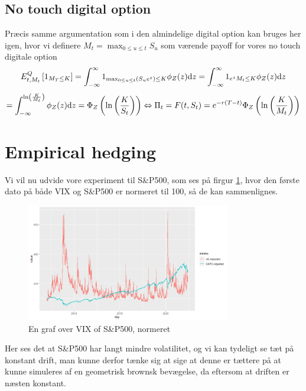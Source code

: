 \documentclass{article}
\theoremstyle{definition}
\theoremstyle{remark}
\newcommand\ens{\Leftrightarrow}
\begin{document}
\subsection{No touch digital option}
Præcis samme argumentation som i den almindelige digital option kan bruges her igen, hvor vi definere $M_t=\max_{0\leq u\leq t}S_u$ som værende payoff for vores no touch digitale option
$$E^Q_{t,M_t}\left[1_{M_T\leq K}\right]=\int_{-\infty}^{\infty}1_{\max_{0\leq u\leq t} (S_ue^{z})\leq K}\phi_Z(z)\text dz=\int_{-\infty}^{\infty}1_{e^{z}M_t\leq K}\phi_Z(z)\text dz$$
$$=\int_{-\infty}^{\ln\left(\frac K{M_t}\right)}\phi_Z(z)\text d z=\Phi_Z\left(\ln\left(\frac{K}{S_t}\right)\right)\ens \Pi_t=F(t,S_t)=e^{-r(T-t)}\Phi_Z\left(\ln\left(\frac{K}{M_t}\right)\right)$$

\section{Empirical hedging}
Vi vil nu udvide vore experiment til S\&P500, som ses på firgur \ref{fig:VIXSP500}, hvor den første dato på både VIX og S\&P500 er normeret til 100, så de kan sammenlignes.
\begin{figure}
    \centering
    \includegraphics[width=3.5in]{Rplot30.png}
    \caption{En graf over VIX of S\&P500, normeret}
    \label{fig:VIXSP500}
\end{figure}
Her ses det at S\&P500 har langt mindre volatilitet, og vi kan tydeligt se tæt på konstant drift, man kunne derfor tænke sig at sige at denne er tættere på at kunne simuleres af en geometrisk brownsk bevægelse, da eftersom at driften er næsten konstant.


\end{document}
